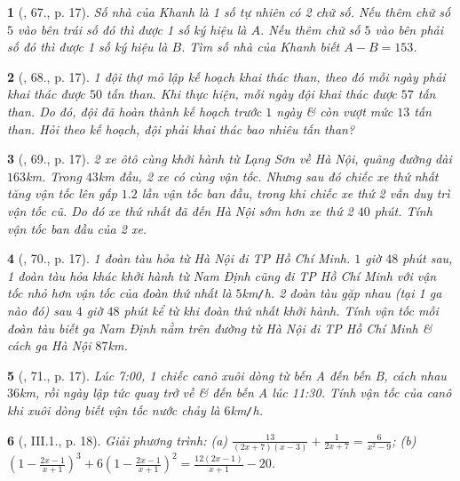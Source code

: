 \documentclass{article}
\newtheorem{baitoan}{}
\begin{document}
\begin{baitoan}[\cite{SBT_Toan_8_tap_2}, 67., p. 17]
	Số nhà của Khanh là 1 số tự nhiên có 2 chữ số. Nếu thêm chữ số $5$ vào bên trái số đó thì được 1 số ký hiệu là $A$. Nếu thêm chữ số $5$ vào bên phải số đó thì được 1 số ký hiệu là $B$. Tìm số nhà của Khanh biết $A - B = 153$.
\end{baitoan}

\begin{baitoan}[\cite{SBT_Toan_8_tap_2}, 68., p. 17]
	1 đội thợ mỏ lập kế hoạch khai thác than, theo đó mỗi ngày phải khai thác được $50$ tấn than. Khi thực hiện, mỗi ngày đội khai thác được $57$ tấn than. Do đó, đội đã hoàn thành kế hoạch trước $1$ ngày \& còn vượt mức $13$ tấn than. Hỏi theo kế hoạch, đội phải khai thác bao nhiêu tấn than?
\end{baitoan}

\begin{baitoan}[\cite{SBT_Toan_8_tap_2}, 69., p. 17]
	2 xe ôtô cùng khởi hành từ Lạng Sơn về Hà Nội, quãng đường dài $163$\emph{km}. Trong $43$\emph{km} đầu, 2 xe có cùng vận tốc. Nhưng sau đó chiếc xe thứ nhất tăng vận tốc lên gấp $1.2$ lần vận tốc ban đầu, trong khi chiếc xe thứ 2 vẫn duy trì vận tốc cũ. Do đó xe thứ nhất đã đến Hà Nội sớm hơn xe thứ 2 $40$ phút. Tính vận tốc ban đầu của 2 xe.
\end{baitoan}

\begin{baitoan}[\cite{SBT_Toan_8_tap_2}, 70., p. 17]
	1 đoàn tàu hỏa từ Hà Nội đi TP Hồ Chí Minh. $1$ giờ $48$ phút sau, 1 đoàn tàu hỏa khác khởi hành từ Nam Định cũng đi TP Hồ Chí Minh với vận tốc nhỏ hơn vận tốc của đoàn thứ nhất là $5$\emph{km\texttt{/}h}. 2 đoàn tàu gặp nhau (tại 1 ga nào đó) sau $4$ giờ $48$ phút kể từ khi đoàn thứ nhất khởi hành. Tính vận tốc mỗi đoàn tàu biết ga Nam Định nằm trên đường từ Hà Nội đi TP Hồ Chí Minh \& cách ga Hà Nội $87$\emph{km}.
\end{baitoan}

\begin{baitoan}[\cite{SBT_Toan_8_tap_2}, 71., p. 17]
	Lúc 7:00, 1 chiếc canô xuôi dòng từ bến A đến bến B, cách nhau  $36$\emph{km}, rồi ngày lập tức quay trở về \& đến bến A lúc 11:30. Tính vận tốc của canô khi xuôi dòng biết vận tốc nước chảy là $6$\emph{km\texttt{/}h}.
\end{baitoan}

\begin{baitoan}[\cite{SBT_Toan_8_tap_2}, III.1., p. 18]
	Giải phương trình: (a) $\frac{13}{(2x + 7)(x - 3)} + \frac{1}{2x + 7} = \frac{6}{x^2 - 9}$; (b) $\left(1 - \frac{2x - 1}{x + 1}\right)^3 + 6\left(1 - \frac{2x - 1}{x + 1}\right)^2 = \frac{12(2x - 1)}{x + 1} - 20$.
\end{baitoan}
\end{document}
